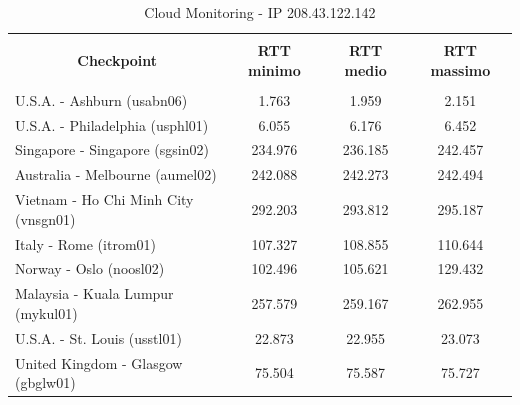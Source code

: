 \documentclass[a4paper,11pt]{book}
\begin{document}
\begin{table}[!ht]
\begin{tabular}{|l|c|c|c|}
\hline
\multicolumn{1}{|c|}{\textbf{}} & {\textbf{}} & {\textbf{}} & {\textbf{}}\\
\multicolumn{1}{|c|}{\textbf{Checkpoint}} & {\textbf{RTT minimo}} & {\textbf{RTT medio}} & {\textbf{RTT massimo}}\\
\multicolumn{1}{|c|}{\textbf{}} & {\textbf{}} & {\textbf{}} & {\textbf{}}\\
\hline
U.S.A. - Ashburn (usabn06) & 1.763 & 1.959 & 2.151\\
U.S.A. - Philadelphia (usphl01) & 6.055 & 6.176 & 6.452\\
Singapore - Singapore (sgsin02) & 234.976 & 236.185 & 242.457\\
Australia - Melbourne (aumel02) & 242.088 & 242.273 & 242.494\\
Vietnam - Ho Chi Minh City (vnsgn01) & 	292.203 & 293.812 & 295.187\\
Italy - Rome (itrom01) & 107.327 & 108.855 & 110.644\\
Norway - Oslo (noosl02) & 102.496 & 105.621 & 129.432\\
Malaysia - Kuala Lumpur (mykul01) & 257.579 & 259.167 & 262.955\\
U.S.A. - St. Louis (usstl01) & 22.873 & 22.955 & 23.073\\
United Kingdom - Glasgow (gbglw01) & 75.504 & 75.587 & 75.727\\
\hline
\end{tabular}
\caption{Cloud Monitoring - IP 208.43.122.142}\label{table:Monitoring_4}
\end{table}

~ 
\end{document}
